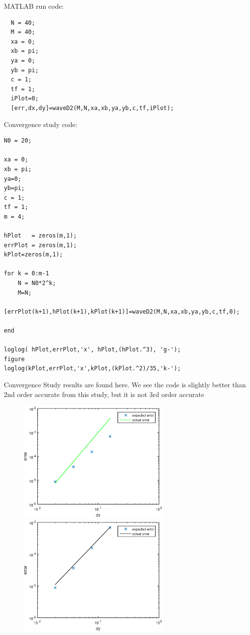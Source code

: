 MATLAB run code:
\begin{lstlisting}
  N = 40;
  M = 40;
  xa = 0;
  xb = pi;
  ya = 0;
  yb = pi;
  c = 1;
  tf = 1;
  iPlot=0;
  [err,dx,dy]=waveD2(M,N,xa,xb,ya,yb,c,tf,iPlot);
\end{lstlisting}
\vspace{.4in}
Convergence study code:
\begin{lstlisting}
N0 = 20;

xa = 0;
xb = pi;
ya=0;
yb=pi;
c = 1;
tf = 1;
m = 4;

hPlot   = zeros(m,1);
errPlot = zeros(m,1);
kPlot=zeros(m,1);

for k = 0:m-1
    N = N0*2^k;
    M=N;
   [errPlot(k+1),hPlot(k+1),kPlot(k+1)]=waveD2(M,N,xa,xb,ya,yb,c,tf,0);

end

loglog( hPlot,errPlot,'x', hPlot,(hPlot.^3), 'g-');
figure
loglog(kPlot,errPlot,'x',kPlot,(kPlot.^2)/35,'k-');
\end{lstlisting}

Convergence Study results are found here. We see the code is slightly better than 2nd order accurate from this study, but it is not 3rd order accurate
\begin{figure}[ht]
\centering
\includegraphics[width=3in]{convstdx}
\includegraphics[width=3in]{convstdy}
\end{figure}

